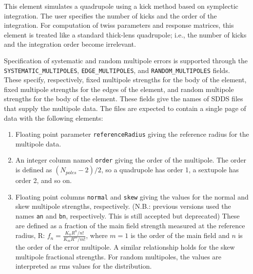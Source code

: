 This element simulates a quadrupole using a kick method based on
symplectic integration.  The user specifies the number of kicks and
the order of the integration.  For computation of twiss parameters and
response matrices, this element is treated like a standard thick-lens
quadrupole; i.e., the number of kicks and the integration order become
irrelevant.

\begin{raggedright}
Specification of systematic and random multipole errors is supported
through the \verb|SYSTEMATIC_MULTIPOLES|, \verb|EDGE_MULTIPOLES|, and 
\verb|RANDOM_MULTIPOLES|
fields.  These specify, respectively, fixed multipole strengths for the
body of the element, fixed multipole strengths for the edges of the element,
and random multipole strengths for the body of the element.
These fields give the names of SDDS files that supply the
multipole data.  The files are expected to contain a single page of
data with the following elements:
\end{raggedright}
\begin{enumerate}
\item Floating point parameter {\tt referenceRadius} giving the reference
 radius for the multipole data.
\item An integer column named {\tt order} giving the order of the multipole.
The order is defined as $(N_{poles}-2)/2$, so a quadrupole has order 1, a
sextupole has order 2, and so on.
\item Floating point columns {\tt normal} and {\tt skew} giving the values for the
normal and skew multipole strengths, respectively.  
(N.B.: previous versions used the names {\tt an} and {\tt bn}, respectively. This is still accepted but deprecated)
These are defined as a fraction 
of the main field strength measured at the reference radius, R: 
$f_n  = \frac{K_n R^n / n!}{K_m R^m / m!}$, where 
$m=1$ is the order of the main field and $n$ is the order of the error multipole.
A similar relationship holds for the skew multipole fractional strengths.
For random multipoles, the values are interpreted as rms values for the distribution.
\end{enumerate}

